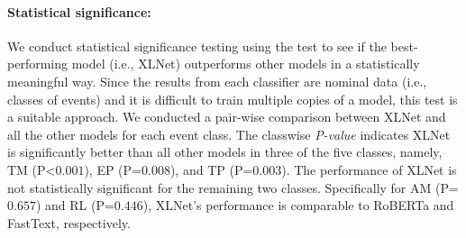 \documentclass[letterpaper]{article} %
\begin{document}

\paragraph{Statistical significance:}
We conduct statistical significance testing using the \citeauthor{mcnemar1947note}  test to see if the best-performing model (i.e., XLNet) outperforms other models in a statistically meaningful way. Since the results from each classifier are nominal data (i.e., classes of events) and it is difficult to train multiple copies of a model, this test is a suitable approach. We conducted a pair-wise comparison between XLNet and all the other models for each event class. The classwise \textit{P-value} indicates XLNet is significantly better than all other models in three of the five classes, namely, TM (P\textless$0.001$), EP (P=$0.008$), and TP (P=$0.003$). The performance of XLNet is not statistically significant for the remaining two classes. Specifically for AM (P=$0.657$) and RL (P=$0.446$), XLNet's performance is comparable to RoBERTa and FastText, respectively. %

\end{document}
